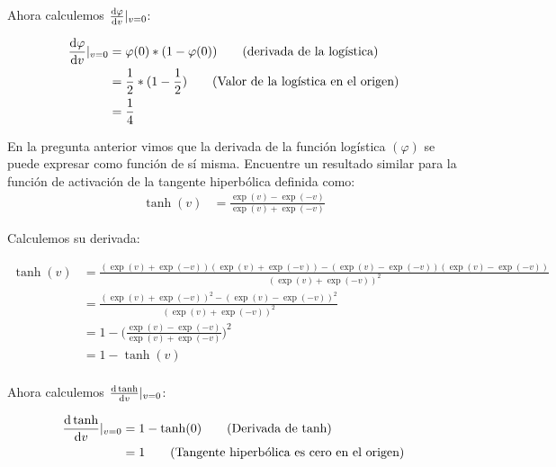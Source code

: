 \documentclass[11pt,spanish,answers]{exam}
\begin{document}
\begin{questions}
\begin{solution}
        Ahora calculemos $  \dv{\varphi}{v} |_{v=0} $:
        
        \begin{align*}
           \dv{\varphi}{v} |_{v=0} &=  \varphi(0)*(1 - \varphi(0))  \tag*{(derivada de la logística)} \\
           &=  \frac{1}{2}*(1 - \frac{1}{2})  \tag*{(Valor de la logística en el origen)} \\
           &=  \frac{1}{4} \\
        \end{align*}
        
        
    \end{solution}

\question 
En la pregunta anterior vimos que la derivada de la función logística $(\varphi)$ se puede expresar como función de sí misma. Encuentre un resultado similar para la función de activación de la tangente hiperbólica definida como:
\begin{equation} \label{eq3}
    \begin{split}
        \tanh(v) & = \frac{\exp(v) - \exp(-v)}{\exp(v) + \exp(-v)}
    \end{split}
\end{equation}

    \begin{solution}
        Calculemos su derivada:
        
        \begin{align*}
           \tanh(v) &=  \frac{(\exp(v) + \exp(-v))(\exp(v) + \exp(-v)) - (\exp(v) - \exp(-v))(\exp(v) - \exp(-v))}{(\exp(v) + \exp(-v))^2} \tag*{(derivada de una fracción)} \\
           &=  \frac{(\exp(v) + \exp(-v))^2 - (\exp(v) - \exp(-v))^2}{(\exp(v) + \exp(-v))^2} \tag*{(Simplificando)} \\
           &=  1 - \Big(\frac{\exp(v) - \exp(-v)}{\exp(v) + \exp(-v)}\Big)^2 \tag*{(Simplificando)} \\
           &=  1 - \tanh(v) \tag*{(Ecuación 3)} \\
        \end{align*}
        
        Ahora calculemos $  \dv{\tanh}{v} |_{v=0} $:
        
        \begin{align*}
            \dv{\tanh}{v} |_{v=0} &= 1 - \tanh(0) \tag*{(Derivada de tanh)} \\
            &= 1 \tag*{(Tangente hiperbólica es cero en el origen)} \\
        \end{align*}
        

\end{solution}
\end{questions}
\end{document}
